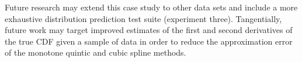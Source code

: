 \documentclass[letterpaper, 10 pt, conference]{ieeeconf}  %
\begin{document}
Future research may extend this case study to other data sets and include a more exhaustive distribution prediction test suite (experiment three). Tangentially, future work may target improved estimates of the first and second derivatives of the true CDF given a sample of data in order to reduce the approximation error of the monotone quintic and cubic spline methods.

\balance









\end{document}
